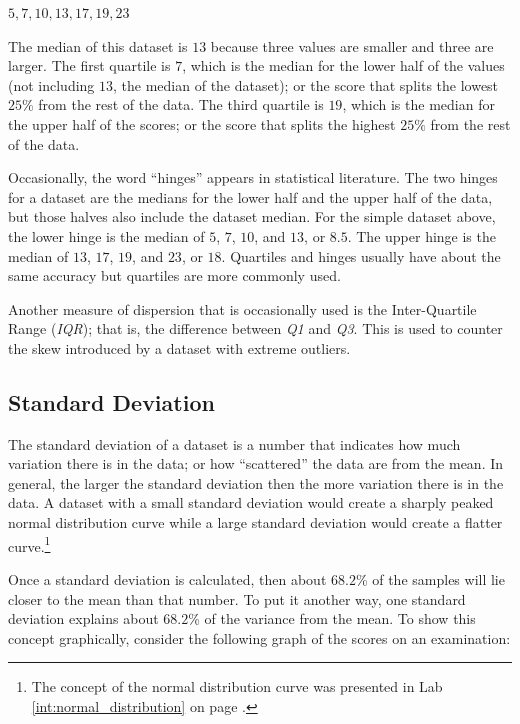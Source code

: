 \begin{center}
  $ 5, 7, 10, 13, 17, 19, 23 $
\end{center}

The median of this dataset is $ 13 $ because three values are smaller and three are larger. The first quartile is $ 7 $, which is the median for the lower half of the values (not including $ 13 $, the median of the dataset); or the score that splits the lowest $ 25 \% $ from the rest of the data. The third quartile is $ 19 $, which is the median for the upper half of the scores; or the score that splits the highest $ 25 \% $ from the rest of the data. 

Occasionally, the word ``hinges'' appears in statistical literature. The two hinges for a dataset are the medians for the lower half and the upper half of the data, but those halves also include the dataset median. For the simple dataset above, the lower hinge is the median of $ 5 $, $ 7 $, $ 10 $, and $ 13 $, or $ 8.5 $. The upper hinge is the median of $ 13 $, $ 17 $, $ 19 $, and $ 23 $, or $ 18 $. Quartiles and hinges usually have about the same accuracy but quartiles are more commonly used.

Another measure of dispersion that is occasionally used is the Inter-Quartile Range (\textit{IQR}); that is, the difference between \textit{Q1} and \textit{Q3}. This is used to counter the skew introduced by a dataset with extreme outliers.

\subsection{Standard Deviation}\label{dis:standard_deviation}

The standard deviation of a dataset is a number that indicates how much variation there is in the data; or how ``scattered'' the data are from the mean. In general, the larger the standard deviation then the more variation there is in the data. A dataset with a small standard deviation would create a sharply peaked normal distribution curve while a large standard deviation would create a flatter curve.\footnote{The concept of the normal distribution curve was presented in Lab \ref{int:normal_distribution} on page \pageref{int:normal_distribution}.}

Once a standard deviation is calculated, then about $ 68.2 $\% of the samples will lie closer to the mean than that number. To put it another way, one standard deviation explains about $ 68.2 $\% of the variance from the mean. To show this concept graphically, consider the following graph of the scores on an examination:

